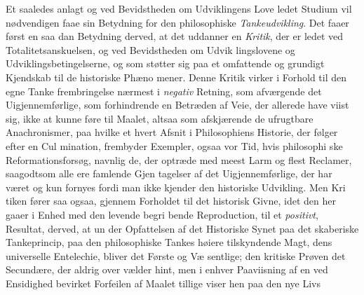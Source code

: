 Et saaledes anlagt og ved Bevidstheden om Udviklingens
Love ledet Studium vil nødvendigen faae sin Betydning for
den philosophiske \emph{Tankeudvikling}. Det faaer først en saa\-%
dan Betydning derved, at det uddanner en \emph{Kritik}, der er
ledet ved Totalitetsanskuelsen, og ved Bevidstheden om Udvik\-%
lingslovene og Udviklingsbetingelserne, og som støtter sig paa
et omfattende og grundigt Kjendskab til de historiske Phæno\-%
mener. Denne Kritik virker i Forhold til den egne Tanke\-%
frembringelse nærmest i \emph{negativ} Retning, som afværgende det
Uigjennemførlige, som forhindrende en Betræden af Veie, der
allerede have viist sig, ikke at kunne føre til Maalet, altsaa
som afskjærende de ufrugtbare Anachronismer, paa hvilke et\-%
hvert Afsnit i Philosophiens Historie, der følger efter en Cul\-%
mination, frembyder Exempler, ogsaa vor Tid, hvis philosophi\-%
ske Reformationsforsøg, navnlig de, der optræde med meest
Larm og flest Reclamer, saagodtsom alle ere famlende Gjen\-%
tagelser af det Uigjennemførlige, der har været og kun fornyes
fordi man ikke kjender den historiske Udvikling. Men Kri\-%
tiken fører saa ogsaa, gjennem Forholdet til det historisk
Givne, idet den her gaaer i Enhed med den levende begri\-%
bende Reproduction, til et \emph{positivt}, Resultat, derved, at un\-%
der Opfattelsen af det Historiske Synet paa det skaberiske
Tankeprincip, paa den philosophiske Tankes høiere tilskyndende
Magt, dens universelle Entelechie, bliver det Første og Væ\-%
sentlige; den kritiske Prøven det Secundære, der aldrig over\-%
vælder hint, men i enhver Paaviisning af en ved Ensidighed
bevirket Forfeilen af Maalet tillige viser hen paa den nye Livs\-%
